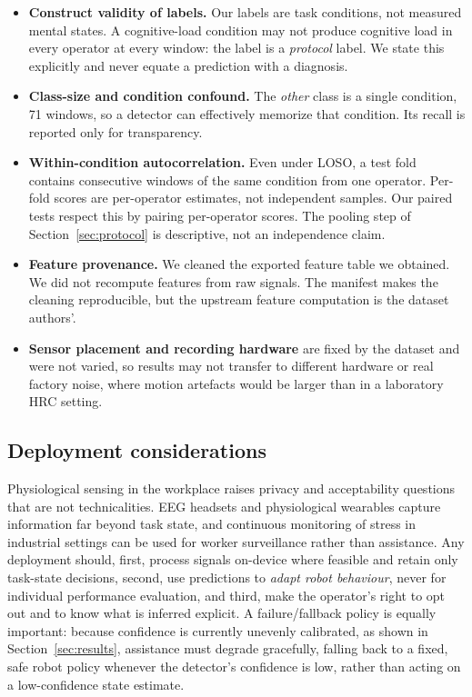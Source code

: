 \documentclass{llncs}
\begin{document}
\begin{itemize}
\item \textbf{Construct validity of labels.} Our labels are task conditions, not
measured mental states. A cognitive-load condition may not produce cognitive load in
every operator at every window: the label is a \emph{protocol} label. We state this
explicitly and never equate a prediction with a diagnosis.
\item \textbf{Class-size and condition confound.} The \emph{other} class is a single
condition, 71 windows, so a detector can effectively memorize that condition. Its
recall is reported only for transparency.
\item \textbf{Within-condition autocorrelation.} Even under \ac{LOSO}, a test fold
contains consecutive windows of the same condition from one operator. Per-fold scores
are per-operator estimates, not independent samples. Our paired tests respect this by
pairing per-operator scores. The pooling step of Section~\ref{sec:protocol} is
descriptive, not an independence claim.
\item \textbf{Feature provenance.} We cleaned the exported feature table we obtained.
We did not recompute features from raw signals. The manifest makes the cleaning
reproducible, but the upstream feature computation is the dataset authors'.
\item \textbf{Sensor placement and recording hardware} are fixed by the dataset and
were not varied, so results may not transfer to different hardware or real factory noise,
where motion artefacts would be larger than in a laboratory \ac{HRC} setting.
\end{itemize}

\subsection{Deployment considerations}

Physiological sensing in the workplace raises privacy and acceptability questions that
are not technicalities. \ac{EEG} headsets and physiological wearables capture
information far beyond task state, and continuous monitoring of stress in industrial
settings can be used for worker surveillance rather than assistance. Any deployment
should, first, process signals on-device where feasible and retain only task-state
decisions, second, use predictions to \emph{adapt robot behaviour}, never for
individual performance evaluation, and third, make the operator's right to opt out and
to know what is inferred explicit. A failure/fallback policy is equally important:
because confidence is currently unevenly calibrated, as shown in
Section~\ref{sec:results}, assistance
must degrade gracefully, falling back to a fixed, safe robot policy whenever the
detector's confidence is low, rather than acting on a low-confidence state estimate.
\end{document}
